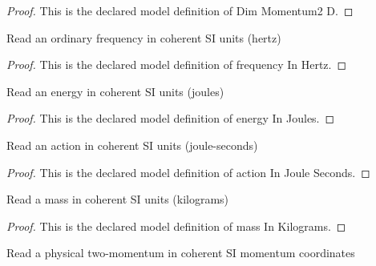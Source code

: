 \begin{proof}
  This is the declared model definition of Dim Momentum2 D.
\end{proof}
\begin{definition}
  \label{def:physics:phyx-mini-0548:phyxminiproblems-problemphyxmini0548-frequencyinhertz}
  Read an ordinary frequency in coherent SI units (hertz)
\end{definition}
\begin{proof}
  This is the declared model definition of frequency In Hertz.
\end{proof}
\begin{definition}
  \label{def:physics:phyx-mini-0548:phyxminiproblems-problemphyxmini0548-energyinjoules}
  Read an energy in coherent SI units (joules)
\end{definition}
\begin{proof}
  This is the declared model definition of energy In Joules.
\end{proof}
\begin{definition}
  \label{def:physics:phyx-mini-0548:phyxminiproblems-problemphyxmini0548-actioninjouleseconds}
  Read an action in coherent SI units (joule-seconds)
\end{definition}
\begin{proof}
  This is the declared model definition of action In Joule Seconds.
\end{proof}
\begin{definition}
  \label{def:physics:phyx-mini-0548:phyxminiproblems-problemphyxmini0548-massinkilograms}
  Read a mass in coherent SI units (kilograms)
\end{definition}
\begin{proof}
  This is the declared model definition of mass In Kilograms.
\end{proof}
\begin{definition}[momentum In SI]
  \label{def:physics:phyx-mini-0548:phyxminiproblems-problemphyxmini0548-momentuminsi}
  Read a physical two-momentum in coherent SI momentum coordinates
\end{definition}
